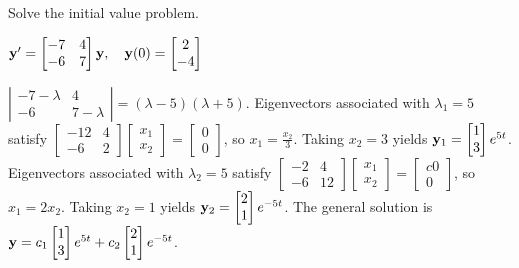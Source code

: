 \documentclass{ximera}
\begin{document}
\begin{problem}\label{exer:10.4.16}
Solve the initial value problem.

$ {\bf y}'=\begin{bmatrix}-7&4\\-6&7\end{bmatrix}{\bf y},\quad{\bf
y}(0)=\begin{bmatrix}2\\-4\end{bmatrix}$

\begin{solution}
    $ \left|\begin{array}{cc}-7-\lambda&4\\-6&7-\lambda\end{array}\right|
=(\lambda-5)(\lambda+5)$.
Eigenvectors  associated with $\lambda_1=5$  satisfy
$ \begin{bmatrix}-12&4\\-6&2
\end{bmatrix}\begin{bmatrix}
x_1\\x_2\end{bmatrix}=\begin{bmatrix} 0\\0\end{bmatrix}$,
so $x_1=\frac{x_2 }{3}$.  Taking $x_2=3$ yields
${\bf y}_1= \begin{bmatrix} 1\\3\end{bmatrix}e^{5t}$.
Eigenvectors  associated with $\lambda_2=5$
satisfy
$ \begin{bmatrix}-2&4\\-6&12
\end{bmatrix}\begin{bmatrix}
x_1\\x_2\end{bmatrix}=\begin{bmatrix}{c} 0\\0\end{bmatrix}$,
so $x_1=2x_2$.  Taking $x_2=1$ yields
${\bf y}_2= \begin{bmatrix}2\\1\end{bmatrix}e^{-5t}$.
The general solution is
${\bf y}=c_1 \begin{bmatrix}
1\\3\end{bmatrix}e^{5t}+
c_2 \begin{bmatrix}2\\1\end{bmatrix}e^{-5t}$.

\end{solution}
\end{problem}
\end{document}
